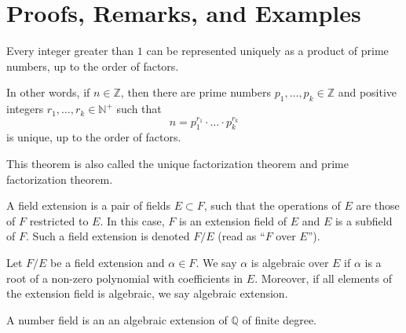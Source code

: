 \section{Proofs, Remarks, and Examples}
\begin{thmbox}
    \begin{theorem}
        Every integer greater than \(1\) can be represented uniquely as a product of prime numbers, up to the order of factors.

        In other words, if \(n \in \mathbb{Z}\), then there are prime numbers \(p_1, \ldots, p_k \in \mathbb{Z}\) and positive integers \(r_1, \ldots, r_k \in \mathbb{N}^+\) such that
        \begin{equation*}
            n = p_1^{r_1} \cdot \ldots \cdot p_k^{r_k}
        \end{equation*}
        is unique, up to the order of factors.
    \end{theorem}
\end{thmbox}
\begin{remark}
    This theorem is also called the unique factorization theorem and prime factorization theorem.
\end{remark}
%
\begin{defbox}
    \begin{definition}
        A field extension is a pair of fields \(E \subset F\), such that the operations of \(E\) are those of \(F\) restricted to \(E\). In this case, \(F\) is an extension field of \(E\) and \(E\) is a subfield of \(F\). Such a field extension is denoted \(F / E\) (read as ``\(F\) over \(E\)'').
    \end{definition}
\end{defbox}
%
\begin{defbox}
    \begin{definition}
        Let \(F / E\) be a field extension and \(\alpha \in F\). We say \(\alpha\) is algebraic over \(E\) if \(\alpha\) is a root of a non-zero polynomial with coefficients in \(E\). Moreover, if all elements of the extension field is algebraic, we say algebraic extension.
    \end{definition}
\end{defbox}
%
\begin{defbox}
    \begin{definition}
        A number field is an an algebraic extension of \(\mathbb{Q}\) of finite degree.
    \end{definition}
\end{defbox}
